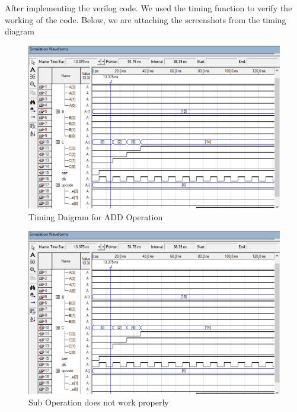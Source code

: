 After implementing the verilog code.
We used the timing function to verify the working of the code.
Below, we are attaching the screenshots from the timing diagram

\begin{figure}[h]
    \begin{center}
        \includegraphics[scale=0.2]{figures/add}
    \end{center}
    \caption{Timing Daigram for ADD Operation}
    \label{fig:timing add}
\end{figure}

\begin{figure}[h]
    \begin{center}
        \includegraphics[scale=0.2]{figures/add}
    \end{center}
    \caption{Sub Operation does not work properly}
    \label{fig:timing sub}
\end{figure}

